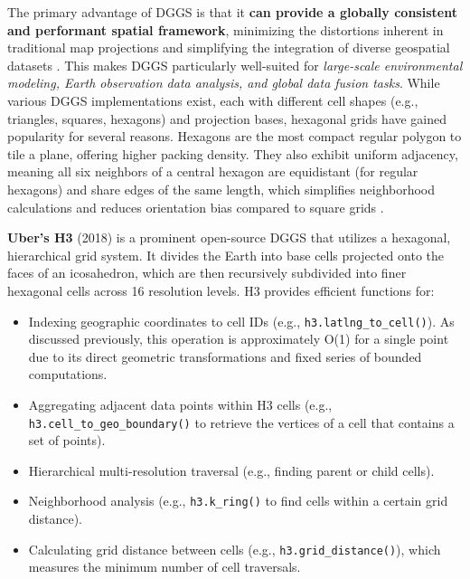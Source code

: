 \begin{multicols}{2}
The primary advantage of DGGS is that it \textbf{can provide a globally consistent and performant spatial framework}, minimizing the distortions inherent in traditional map projections and simplifying the integration of diverse geospatial datasets \cite{ESRI_DGGS_Intro_2023, XDGGS_Kmoch_2024}. 
This makes DGGS particularly well-suited for \textit{large-scale environmental modeling, Earth observation data analysis, and global data fusion tasks}.
While various DGGS implementations exist, each with different cell shapes (e.g., triangles, squares, hexagons) and projection bases, hexagonal grids have gained popularity for several reasons. 
Hexagons are the most compact regular polygon to tile a plane, offering higher packing density. 
They also exhibit uniform adjacency, meaning all six neighbors of a central hexagon are equidistant (for regular hexagons) and share edges of the same length, which simplifies neighborhood calculations and reduces orientation bias compared to square grids \cite{XDGGS_Kmoch_2024}.

\textbf{Uber's H3} (2018) is a prominent open-source DGGS that utilizes a hexagonal, hierarchical grid system. 
It divides the Earth into base cells projected onto the faces of an icosahedron, which are then recursively subdivided into finer hexagonal cells across 16 resolution levels\cite{H3_Overview}. 
H3 provides efficient functions for:
\begin{itemize}
    \item Indexing geographic coordinates to cell IDs (e.g., \texttt{h3.latlng\_to\_cell()}). As discussed previously, this operation is approximately O(1) for a single point due to its direct geometric transformations and fixed series of bounded computations.
    \item Aggregating adjacent data points within H3 cells (e.g., \texttt{h3.cell\_to\_geo\_boundary()} to retrieve the vertices of a cell that contains a set of points).
    \item Hierarchical multi-resolution traversal (e.g., finding parent or child cells).
    \item Neighborhood analysis (e.g., \texttt{h3.k\_ring()} to find cells within a certain grid distance).
    \item Calculating grid distance between cells (e.g., \texttt{h3.grid\_distance()}), which measures the minimum number of cell traversals.
\end{itemize}


\end{multicols}
